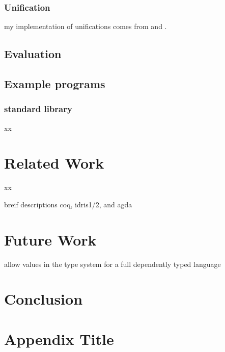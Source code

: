 \documentclass[12pt]{report}
\begin{document}
 
\subsection{Unification}
my implementation of unifications comes from \cite{Norvig1991CorrectingAW} and \cite{inproceedings}.


\section{Evaluation}


\section{Example programs}
\subsection{standard library}
xx

\chapter{Related Work}
xx

breif descriptions 
coq, idris1/2, and agda

\chapter{Future Work}
allow values in the type system for a full dependently typed language
% 

\chapter{Conclusion}
% 



\printbibliography

\appendix
\chapter{Appendix Title}
% 
\end{document}
